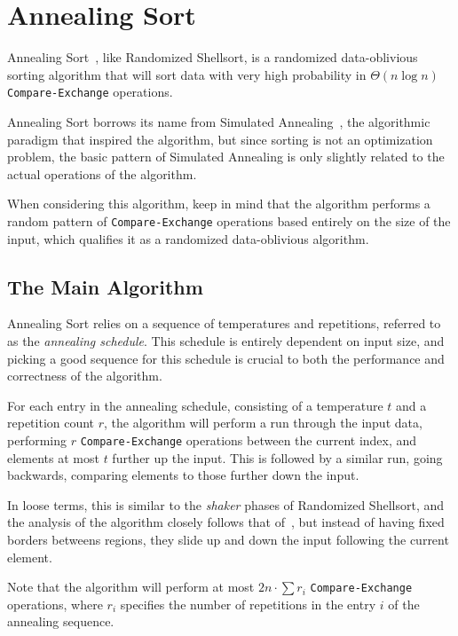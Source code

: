 \FloatBarrier 
\section{Annealing Sort}

Annealing Sort~, like Randomized Shellsort, is a randomized data-oblivious sorting algorithm that will sort data with very high probability in $\Theta(n \log n)$ \texttt{Compare-Exchange} operations.

Annealing Sort borrows its name from Simulated Annealing~, the algorithmic paradigm that inspired the algorithm, but since sorting is not an optimization problem, the basic pattern of Simulated Annealing is only slightly related to the actual operations of the algorithm.

When considering this algorithm, keep in mind that the algorithm performs a random pattern of \texttt{Compare-Exchange} operations based entirely on the size of the input, which qualifies it as a randomized data-oblivious algorithm.

\subsection{The Main Algorithm}
\label{sec:AnnealingSortMain}

Annealing Sort relies on a sequence of temperatures and repetitions, referred to as the \emph{annealing schedule}. This schedule is entirely dependent on input size, and picking a good sequence for this schedule is crucial to both the performance and correctness of the algorithm.

For each entry in the annealing schedule, consisting of a temperature $t$ and a repetition count $r$, the algorithm will perform a run through the input data, performing $r$ \texttt{Compare-Exchange} operations between the current index, and elements at most $t$ further up the input. 
This is followed by a similar run, going backwards, comparing elements to those further down the input.

In loose terms, this is similar to the \emph{shaker} phases of Randomized Shellsort, and the analysis of the algorithm closely follows that of~, but instead of having fixed borders betweens regions, they slide up and down the input following the current element.

Note that the algorithm will perform at most $2n\cdot\sum{r_i}$  \texttt{Compare-Exchange} operations, where $r_i$ specifies the number of repetitions in the entry $i$ of the annealing sequence.

